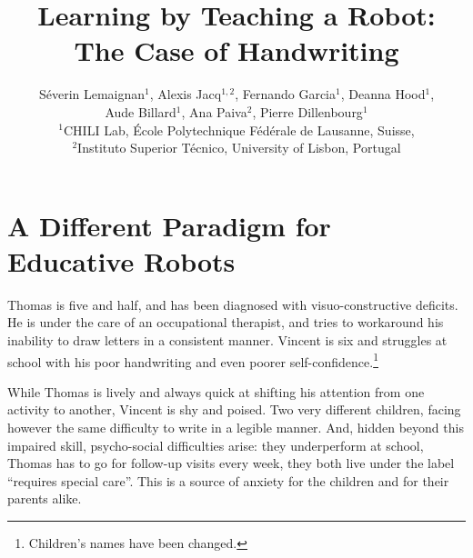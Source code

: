 \documentclass{article}
\title{Learning by Teaching a Robot:\\The Case of Handwriting}
\author{Séverin Lemaignan$^1$, Alexis Jacq$^{1,2}$, Fernando Garcia$^1$,
    Deanna Hood$^1$, \\Aude
    Billard$^1$, Ana Paiva$^2$, Pierre Dillenbourg$^1$ \\
$^1$CHILI Lab, École Polytechnique Fédérale de Lausanne, Suisse,\\
$^2$Instituto Superior Técnico, University of Lisbon, Portugal}
\begin{document}
\maketitle

%
%


\section{A Different Paradigm for Educative Robots}

Thomas is five and half, and has been diagnosed with visuo-constructive
deficits. He is under the care of an occupational therapist, and tries to
workaround his inability to draw letters in a consistent manner. Vincent is six
and struggles at school with his poor handwriting and even poorer
self-confidence.\footnote{Children's names have been changed.}

While Thomas is lively and always quick at shifting his attention from one
activity to another, Vincent is shy and poised. Two very different children,
facing however the same difficulty to write in a legible manner. And, hidden
beyond this impaired skill, psycho-social difficulties arise: they
underperform at school, Thomas has to go for follow-up visits every week,
they both live under the label ``requires special care''. This is a source of
anxiety for the children and for their parents alike.
\end{document}
